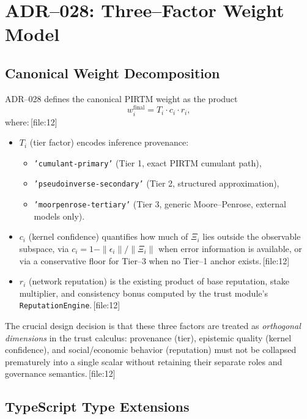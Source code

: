 \documentclass[11pt]{article}
\begin{document}
\section{ADR--028: Three--Factor Weight Model}

\subsection{Canonical Weight Decomposition}

ADR--028 defines the canonical PIRTM weight as the product
\[
  w_i^{\text{final}} = T_i \cdot c_i \cdot r_i,
\]
where:\,[file:12]

\begin{itemize}[leftmargin=*]
  \item \(T_i\) (tier factor) encodes inference provenance:
    \begin{itemize}
      \item \texttt{'cumulant-primary'} (Tier 1, exact PIRTM cumulant path),
      \item \texttt{'pseudoinverse-secondary'} (Tier 2, structured
      approximation),
      \item \texttt{'moorpenrose-tertiary'} (Tier 3, generic Moore--Penrose,
      external models only).
    \end{itemize}
  \item \(c_i\) (kernel confidence) quantifies how much of \(\Xi_i\) lies
  outside the observable subspace, via \(c_i = 1 - \|\epsilon_i\| /
  \|\Xi_i\|\) when error information is available, or via a conservative
  floor for Tier--3 when no Tier--1 anchor exists.\,[file:12]
  \item \(r_i\) (network reputation) is the existing product of base
  reputation, stake multiplier, and consistency bonus computed by the trust
  module's \texttt{ReputationEngine}.\,[file:12]
\end{itemize}

The crucial design decision is that these three factors are treated as
\emph{orthogonal dimensions} in the trust calculus: provenance (tier),
epistemic quality (kernel confidence), and social/economic behavior
(reputation) must not be collapsed prematurely into a single scalar without
retaining their separate roles and governance semantics.\,[file:12]

\subsection{TypeScript Type Extensions}
\end{document}
